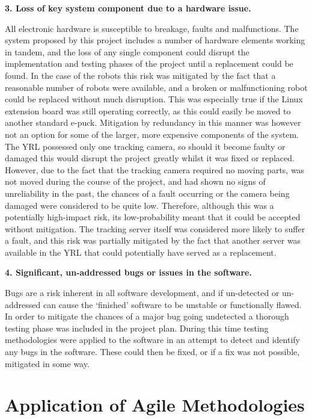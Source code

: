 \noindent\textbf{3. Loss of key system component due to a hardware issue.}

All electronic hardware is susceptible to breakage, faults and malfunctions. The system proposed by this project includes a number of hardware elements working in tandem, and the loss of any single component could disrupt the implementation and testing phases of the project until a replacement could be found. In the case of the robots this risk was mitigated by the fact that a reasonable number of robots were available, and a broken or malfunctioning robot could be replaced without much disruption. This was especially true if the Linux extension board was still operating correctly, as this could easily be moved to another standard e-puck. Mitigation by redundancy in this manner was however not an option for some of the larger, more expensive components of the system. The YRL possessed only one tracking camera, so should it become faulty or damaged this would disrupt the project greatly whilst it was fixed or replaced. However, due to the fact that the tracking camera required no moving parts, was not moved during the course of the project, and had shown no signs of unreliability in the past, the chances of a fault occurring or the camera being damaged were considered to be quite low. Therefore, although this was a potentially high-impact risk, its low-probability meant that it could be accepted without mitigation. The tracking server itself was considered more likely to suffer a fault, and this risk was partially mitigated by the fact that another server was available in the YRL that could potentially have served as a replacement.

\noindent\textbf{4. Significant, un-addressed bugs or issues in the software.}

Bugs are a risk inherent in all software development, and if un-detected or un-addressed can cause the `finished' software to be unstable or functionally flawed. In order to mitigate the chances of a major bug going undetected a thorough testing phase was included in the project plan. During this time testing methodologies were applied to the software in an attempt to detect and identify any bugs in the software. These could then be fixed, or if a fix was not possible, mitigated in some way.


\section{Application of Agile Methodologies} \label{Agile}

